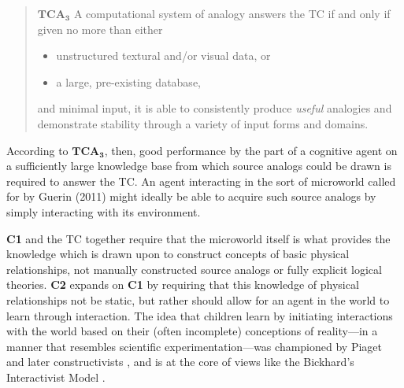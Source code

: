 
\begin{small}
\begin{quote}
\begin{mdframed}[backgroundcolor=gray!15]
$\mathbf{TCA_3}$ A computational system of analogy answers the TC if and only if given no more than either
\begin{itemize}
\item unstructured textural and/or visual data, or
\item a large, pre-existing database,
\end{itemize}
and minimal input, it is able to consistently produce \textit{useful} analogies and demonstrate stability through a variety of input forms and domains.
\end{mdframed}
\end{quote}
\end{small}

According to $\mathbf{TCA_3}$, then, good performance by the part of a cognitive agent on a sufficiently large knowledge base from which source analogs could be drawn is required to answer the TC. An agent interacting in the sort of microworld called for by Guerin (2011) might ideally be able to acquire such source analogs by simply interacting with its environment. 

\textbf{C1} and the TC together require that the microworld itself is what provides the knowledge which is drawn upon to construct concepts of basic physical relationships, not manually constructed source analogs or fully explicit logical theories. \textbf{C2} expands on \textbf{C1} by requiring that this knowledge of physical relationships not be static, but rather should allow for an agent in the world to learn through interaction. The idea that children learn by initiating interactions with the world based on their (often incomplete) conceptions of reality---in a manner that resembles scientific experimentation---was championed by Piaget and later constructivists \cite{vonGlasersfeld1991,Quartz1997,Piaget2001b}, and is at the core of views like the Bickhard's Interactivist Model \cite{Bickhard2008}.

